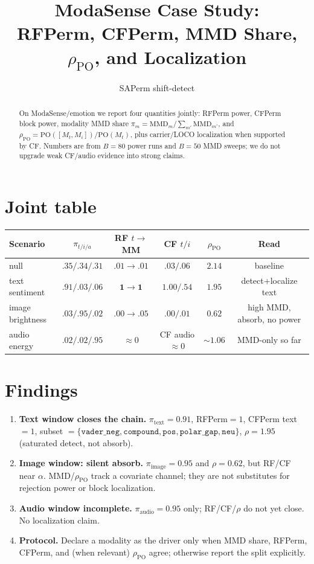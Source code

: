 \documentclass[11pt]{article}
\title{ModaSense Case Study:\\
RFPerm, CFPerm, MMD Share, $\rho_{\mathrm{PO}}$, and Localization}
\author{SAPerm shift-detect}
\date{}
\begin{document}
\maketitle

\begin{abstract}
\noindent
On ModaSense/emotion we report four quantities jointly:
RFPerm power, CFPerm block power, modality MMD share
$\pi_m=\mathrm{MMD}_m/\sum_{m'}\mathrm{MMD}_{m'}$, and
$\rho_{\mathrm{PO}}=\mathrm{PO}([M_t,M_i])/\mathrm{PO}(M_t)$,
plus carrier/LOCO localization when supported by CF.
Numbers are from $B{=}80$ power runs and $B{=}50$ MMD sweeps; we do not
upgrade weak CF/audio evidence into strong claims.
\end{abstract}

\section{Joint table}
\begin{center}
\begin{tabular}{lccccc}
\toprule
Scenario & $\pi_{t/i/a}$ & RF $t\!\to\!$MM & CF $t/i$ & $\rho_{\mathrm{PO}}$ & Read \\
\midrule
null & $.35/.34/.31$ & $.01\!\to\!.01$ & $.03/.06$ & $2.14$ & baseline \\
text sentiment & $\mathbf{.91}/.03/.06$ & $\mathbf{1\!\to\!1}$ & $\mathbf{1.00}/.54$ & $1.95$ & detect+localize text \\
image brightness & $.03/\mathbf{.95}/.02$ & $.00\!\to\!.05$ & $.00/.01$ & $\mathbf{0.62}$ & high MMD, absorb, no power \\
audio energy & $.02/.02/\mathbf{.95}$ & $\approx 0$ & CF audio$\approx 0$ & $\sim 1.06$ & MMD-only so far \\
\bottomrule
\end{tabular}
\end{center}

\section{Findings}
\begin{enumerate}[leftmargin=*]
  \item \textbf{Text window closes the chain.}
        $\pi_{\mathrm{text}}{=}0.91$, RFPerm${=}1$, CFPerm text${=}1$,
        subset $=\{\texttt{vader\_neg},\texttt{compound},\texttt{pos},
        \texttt{polar\_gap},\texttt{neu}\}$, $\rho{=}1.95$
        (saturated detect, not absorb).
  \item \textbf{Image window: silent absorb.}
        $\pi_{\mathrm{image}}{=}0.95$ and $\rho{=}0.62$, but RF/CF near $\alpha$.
        MMD/$\rho_{\mathrm{PO}}$ track a covariate channel; they are not
        substitutes for rejection power or block localization.
  \item \textbf{Audio window incomplete.}
        $\pi_{\mathrm{audio}}{=}0.95$ only; RF/CF/$\rho$ do not yet close.
        No localization claim.
  \item \textbf{Protocol.}
        Declare a modality as the driver only when MMD share, RFPerm,
        CFPerm, and (when relevant) $\rho_{\mathrm{PO}}$ agree; otherwise
        report the split explicitly.
\end{enumerate}
\end{document}

